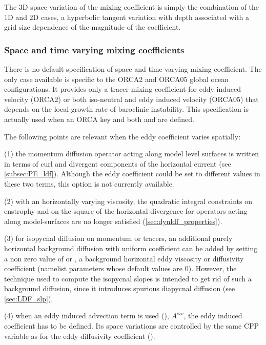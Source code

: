 \documentclass[../main/NEMO_manual]{subfiles}
\begin{document}
The 3D space variation of the mixing coefficient is simply the combination of the 1D and 2D cases,
\ie a hyperbolic tangent variation with depth associated with a grid size dependence of
the magnitude of the coefficient. 

\subsubsection{Space and time varying mixing coefficients}

There is no default specification of space and time varying mixing coefficient. 
The only case available is specific to the ORCA2 and ORCA05 global ocean configurations.
It provides only a tracer mixing coefficient for eddy induced velocity (ORCA2) or both iso-neutral and
eddy induced velocity (ORCA05) that depends on the local growth rate of baroclinic instability.
This specification is actually used when an ORCA key and both  and  are defined.

The following points are relevant when the eddy coefficient varies spatially:

(1) the momentum diffusion operator acting along model level surfaces is written in terms of curl and
divergent components of the horizontal current (see \autoref{subsec:PE_ldf}).
Although the eddy coefficient could be set to different values in these two terms,
this option is not currently available. 

(2) with an horizontally varying viscosity, the quadratic integral constraints on enstrophy and on the square of
the horizontal divergence for operators acting along model-surfaces are no longer satisfied
(\autoref{sec:dynldf_properties}).

(3) for isopycnal diffusion on momentum or tracers, an additional purely horizontal background diffusion with
uniform coefficient can be added by setting a non zero value of  or ,
a background horizontal eddy viscosity or diffusivity coefficient
(namelist parameters whose default values are $0$).
However, the technique used to compute the isopycnal slopes is intended to get rid of such a background diffusion,
since it introduces spurious diapycnal diffusion (see \autoref{sec:LDF_slp}).

(4) when an eddy induced advection term is used (),
$A^{eiv}$, the eddy induced coefficient has to be defined.
Its space variations are controlled by the same CPP variable as for the eddy diffusivity coefficient
(\ie {}). 
\end{document}
